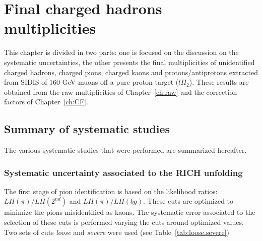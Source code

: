
\chapter{Final charged hadrons multiplicities} %

\label{ch:mult} %


This chapter is divided in two parts: one is focused on the discussion on the systematic uncertainties, the other presents the final multiplicities of unidentified charged hadrons, charged pions, charged kaons and protons/antiprotons extracted from SIDIS of $160$ GeV muons off a pure proton target ($lH_2$). These results are obtained from the raw multiplicities of Chapter~\ref{ch:raw} and the correction factors of Chapter~\ref{ch:CF}.


\section{Summary of systematic studies}

The various systematic studies that were performed are summarized hereafter.


\subsection{Systematic uncertainty associated to the RICH unfolding}

The first stage of pion identification is based on the likelihood ratios: $LH(\pi)/LH(2^{nd})$ and $LH(\pi)/LH(bg)$. These cuts are optimized to minimize the
pions misidentified as kaons. The systematic error associated to the selection of these cuts is performed varying the cuts around optimized values. Two sets of
cuts \textit{loose} and \textit{severe} were used (see Table~\ref{tab:loose.severe})

